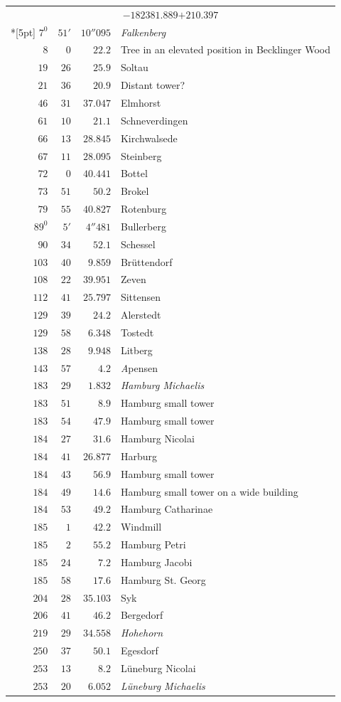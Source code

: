 \begin{longtable}{@{}rrrp{.61\linewidth}@{}}
\multicolumn{4}{c}{\(-182381.889\)\qquad\(+210.397\)}\\*[5pt]
\(7^{0}\)&\(51'\)&\(10''095\)&\raggedright \textit{Falkenberg}\tabularnewline
\(8\)&\(0\)&\(22.2\)&\raggedright Tree in an elevated position in Becklinger Wood\tabularnewline
\(19\)&\(26\)&\(25.9\)&\raggedright Soltau\tabularnewline
\(21\)&\(36\)&\(20.9\)&\raggedright Distant tower?\tabularnewline
\(46\)&\(31\)&\(37.047\)&\raggedright Elmhorst\tabularnewline
\(61\)&\(10\)&\(21.1\)&\raggedright Schneverdingen\tabularnewline
\(66\)&\(13\)&\(28.845\)&\raggedright Kirchwalsede\tabularnewline
\(67\)&\(11\)&\(28.095\)&\raggedright Steinberg\tabularnewline
\(72\)&\(0\)&\(40.441\)&\raggedright Bottel\tabularnewline
\(73\)&\(51\)&\(50.2\)&\raggedright Brokel\tabularnewline
\(79\)&\(55\)&\(40.827\)&\raggedright Rotenburg\tabularnewline
\(89^{0}\)&\(5'\)&\(4''481\)&\raggedright Bullerberg\tabularnewline
\(90\)&\(34\)&\(52.1\)&\raggedright Schessel\tabularnewline
\(103\)&\(40\)&\(9.859\)&\raggedright Brüttendorf\tabularnewline
\(108\)&\(22\)&\(39.951\)&\raggedright Zeven\tabularnewline
\(112\)&\(41\)&\(25.797\)&\raggedright Sittensen\tabularnewline
\(129\)&\(39\)&\(24.2\)&\raggedright Alerstedt\tabularnewline
\(129\)&\(58\)&\(6.348\)&\raggedright Tostedt\tabularnewline
\(138\)&\(28\)&\(9.948\)&\raggedright Litberg\tabularnewline
\(143\)&\(57\)&\(4.2\)&\raggedright \textit{A}pensen\tabularnewline
\(183\)&\(29\)&\(1.832\)&\raggedright \textit{Hamburg Michaelis}\tabularnewline
\(183\)&\(51\)&\(8.9\)&\raggedright Hamburg small tower\tabularnewline
\(183\)&\(54\)&\(47.9\)&\raggedright Hamburg small tower\tabularnewline
\(184\)&\(27\)&\(31.6\)&\raggedright Hamburg Nicolai\tabularnewline
\(184\)&\(41\)&\(26.877\)&\raggedright Harburg\tabularnewline
\(184\)&\(43\)&\(56.9\)&\raggedright Hamburg small tower\tabularnewline
\(184\)&\(49\)&\(14.6\)&\raggedright Hamburg small tower on a wide building\tabularnewline
\(184\)&\(53\)&\(49.2\)&\raggedright Hamburg Catharinae\tabularnewline
\(185\)&\(1\)&\(42.2\)&\raggedright Windmill\tabularnewline
\(185\)&\(2\)&\(55.2\)&\raggedright Hamburg Petri\tabularnewline
\(185\)&\(24\)&\(7.2\)&\raggedright Hamburg Jacobi\tabularnewline
\(185\)&\(58\)&\(17.6\)&\raggedright Hamburg St. Georg\tabularnewline
\(204\)&\(28\)&\(35.103\)&\raggedright Syk\tabularnewline
\(206\)&\(41\)&\(46.2\)&\raggedright Bergedorf\tabularnewline
\(219\)&\(29\)&\(34.558\)&\raggedright \textit{Hohehorn}\tabularnewline
\(250\)&\(37\)&\(50.1\)&\raggedright Egesdorf\tabularnewline
\(253\)&\(13\)&\(8.2\)&\raggedright Lüneburg Nicolai\tabularnewline
\(253\)&\(20\)&\(6.052\)&\raggedright \textit{Lüneburg Michaelis}\tabularnewline

\end{longtable}
